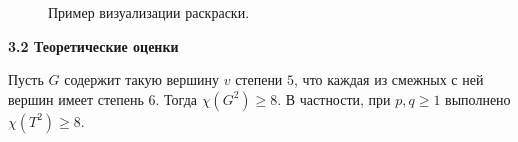 \FloatBarrier
\begin{figure}[!h]
\centering
\captionsetup{justification=centering}
\begin{minipage}[b]{0.5\linewidth}
\vspace{1ex}
\end{minipage}\hfill
\begin{minipage}[b]{0.5\linewidth}
\vspace{1ex}
\end{minipage}\hfill
\begin{minipage}[b]{0.5\linewidth}
\vspace{1ex}
\end{minipage}\hfill
\begin{minipage}[b]{0.5\linewidth}
\vspace{1ex}
\end{minipage}\hfill
\caption{Пример визуализации раскраски.}
\label{chapter3:fig:viz}
\end{figure}

\vspace{5pt}
\textbf{3.2 Теоретические оценки}\label{chapters:3.2}
\vspace{5pt}

\begin{lemma}\label{chapter3:lemma}
Пусть $G$ содержит такую вершину $v$ степени $5$, что каждая из смежных с ней вершин имеет степень $6$. 
Тогда $\chi(G^2) \ge 8$. В частности, при $p,q \ge 1$ выполнено $\chi(T^2) \ge 8$.
\end{lemma}

